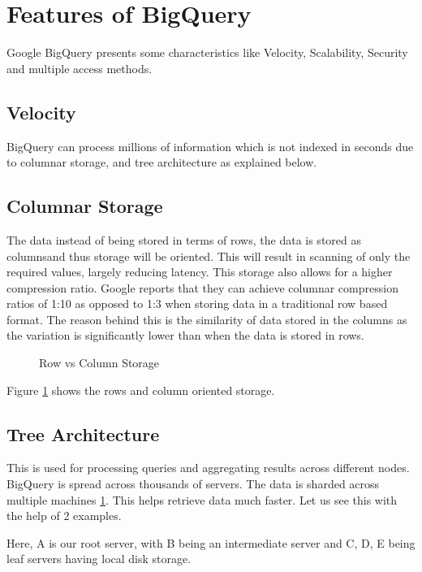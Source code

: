 \documentclass[9pt,twocolumn,twoside]{../../styles/osajnl}
\begin{document}
\section{Features of BigQuery}
Google BigQuery \cite{www-bigquery} presents some characteristics like Velocity,
Scalability, Security and multiple access methods.

\subsection{Velocity}

BigQuery can process millions of information which is not indexed in seconds
due to columnar storage, and tree architecture as explained below.

\subsection{Columnar Storage}
The data instead of being stored in terms of rows, the data is stored
as columnsand thus storage will be oriented. This will result in
scanning of only the required values, largely reducing latency. This
storage also allows for a higher compression ratio. Google reports
\cite{www-rowvscolumnstorage} that they can achieve columnar
compression ratios of 1:10 as opposed to 1:3 when storing data in a
traditional row based format. The reason behind this is the similarity
of data stored in the columns as the variation is significantly lower
than when the data is stored in rows.

\begin{figure}[htbp]
\centering
{}
\caption{\cite{www-rowvscolumnstorage} Row vs Column Storage}
\label{fig:rowvscolumnarstorage}
\end{figure}

Figure \ref{fig:rowvscolumnarstorage} shows the rows and column
oriented storage.

\subsection{Tree Architecture}
This is used for processing queries and aggregating results across
different nodes. BigQuery is spread across thousands of servers. The
data is sharded across multiple machines
\ref{fig:rowvscolumnarstorage}. This helps retrieve data much
faster. Let us see this with the help of 2 examples.

Here, A is our root server, with B being an intermediate server and C,
D, E being leaf servers having local disk storage.
\end{document}

